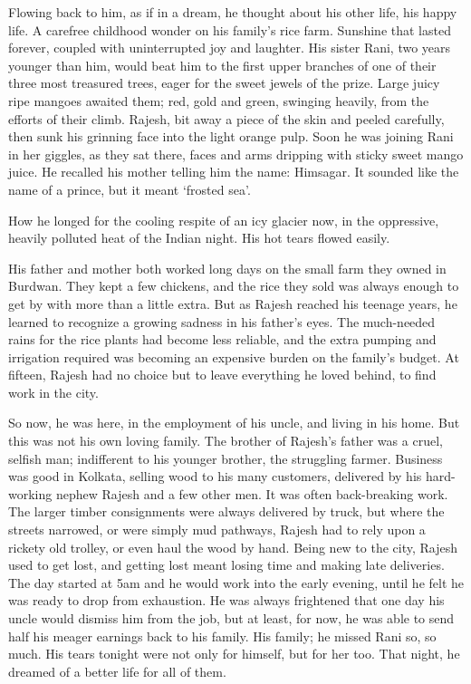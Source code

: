 \documentclass[a5paper,english,openany]{memoir}
\begin{document}
Flowing back to him, as if in a dream, he thought about his other life, his happy life. A carefree childhood wonder on his family’s rice farm. Sunshine that lasted forever, coupled with uninterrupted joy and laughter. His sister Rani, two years younger than him, would beat him to the first upper branches of one of their three most treasured trees, eager for the sweet jewels of the prize. Large juicy ripe mangoes awaited them; red, gold and green, swinging heavily, from the efforts of their climb. Rajesh, bit away a piece of the skin and peeled carefully, then sunk his grinning face into the light orange pulp. Soon he was joining Rani in her giggles, as they sat there, faces and arms dripping with sticky sweet mango juice. He recalled his mother telling him the name: Himsagar. It sounded like the name of a prince, but it meant ‘frosted sea’.

How he longed for the cooling respite of an icy glacier now, in the oppressive, heavily polluted heat of the Indian night. His hot tears flowed easily.

His father and mother both worked long days on the small farm they owned in Burdwan. They kept a few chickens, and the rice they sold was always enough to get by with more than a little extra. But as Rajesh reached his teenage years, he learned to recognize %
a growing sadness in his father’s eyes. The much-needed rains for the rice plants had become less reliable, and the extra pumping and irrigation required was becoming an expensive burden on the family’s budget. At fifteen, Rajesh had no choice but to leave everything he loved behind, to find work in the city.

So now, he was here, in the employment of his uncle, and living in his home. But this was not his own loving family. The brother of Rajesh’s father was a cruel, selfish man; indifferent to his younger brother, the struggling farmer. Business was good in Kolkata, selling wood to his many customers, delivered by his hard-working nephew Rajesh and a few other men. It was often back-breaking work. The larger timber consignments were always delivered by truck, but where the streets narrowed, or were simply mud pathways, Rajesh had to rely upon a rickety old trolley, or even haul the wood by hand. Being new to the city, Rajesh used to get lost, and getting lost meant losing time and making late deliveries. The day started at 5am and he would work into the early evening, until he felt he was ready to drop from exhaustion. He was always frightened that one day his uncle would dismiss him from the job, but at least, for now, he was able to send half his meager earnings back to his family. His family; he missed Rani so, so much. His tears tonight were not only for himself, but for her too. That night, he dreamed of a better life for all of them.
\end{document}
